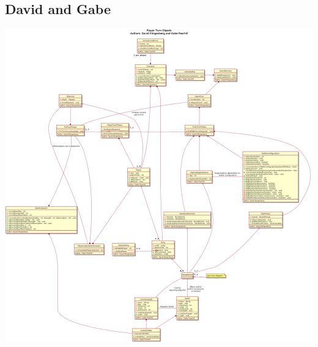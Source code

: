 \documentclass[12pt,a4paper]{article}
\begin{document}
\subsection{David and Gabe}
\includegraphics[width=\textwidth]{DavidGabeDiagram.png}
\end{document}
